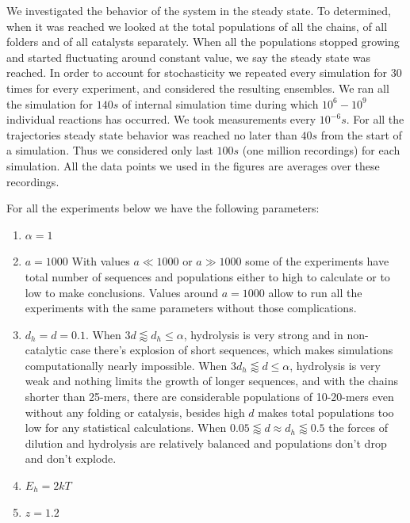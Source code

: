 \documentclass[journal=jacsat,manuscript=article,layout=twocolumn]{achemso}
\newcommand*{\ga}{\alpha}
\begin{document}
We investigated the behavior of the system in the steady state. To determined, when it was reached 
we looked at the total populations of all the chains, of all folders and of all catalysts 
separately. When all the populations stopped growing and started fluctuating around constant value, 
we say the steady state was reached. In order 
to account for stochasticity we repeated every simulation for 30 times for every experiment, and 
considered the resulting ensembles. We ran all the simulation for $140s$ of internal simulation 
time 
during which $10^6-10^9$ individual reactions has occurred. We took measurements every $10^{-6}s.$ 
For all the trajectories steady state behavior was reached no later than $40s$ from the start of 
a simulation. Thus we considered only last $100s$ (one million recordings) for each simulation. All 
the data points we used in the figures are averages over these recordings.


For all the experiments below we have the following parameters:
\begin{enumerate}
 \item $\ga = 1$
 \item $a=1000$
 \subitem With values $a\ll 1000\,\,\mbox{or}\,\,a\gg1000$ some of the experiments have total 
number of sequences and populations either to high to calculate or to low to make conclusions. 
Values around $a=1000$ allow to run all the experiments with the same parameters without those 
complications.
 \item $d_h=d=0.1$.
 \subitem When $3d\lessapprox d_h\leq\ga$, hydrolysis is very strong and in 
non-catalytic case there's explosion of short sequences, which makes simulations computationally 
nearly impossible. 
\subitem When $3d_h\lessapprox d\leq\ga$, hydrolysis is very weak and nothing limits the 
growth of longer sequences, and with the chains shorter than 25-mers, there are considerable 
populations of 10-20-mers even without any folding or catalysis, besides high $d$ makes total 
populations too low for any statistical calculations. 
\subitem When $0.05\lessapprox d\approx d_h \lessapprox 0.5$ the forces of dilution and hydrolysis 
are relatively balanced and populations don't drop and don't explode.
 \item $E_h = 2kT$
 \item $z=1.2$
\end{enumerate}
\end{document}
